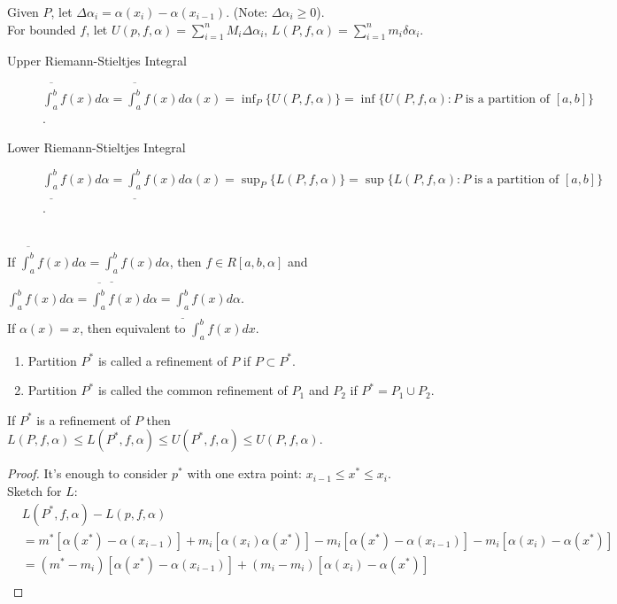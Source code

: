 \begin{define}[2]
	Given $P$, let $\Delta \alpha_i=\alpha(x_{i})-\alpha(x_{i-1})$. (Note: $\Delta \alpha_i\ge 0$).\\
	For bounded $f$, let $U(p,f,\alpha)=\sum_{i=1}^{n}{M_{i} \Delta \alpha_i}$, $L(P,f,\alpha)=\sum_{i=1}^{n}{m_{i}}\delta \alpha_i$.\\
	\begin{description}
		\item[Upper Riemann-Stieltjes Integral] $\overline{\int_{a}^{b}}f(x)d\alpha=\overline{\int_{a}^{b}}f(x)d\alpha(x)=\inf_{P}\{U(P,f,\alpha)\}=\inf\{U(P,f,\alpha):P\text{ is a partition of }[a,b]\}$.
		\item[Lower Riemann-Stieltjes Integral] $\underline{\int_{a}^{b}}f(x)d\alpha=\underline{\int_{a}^{b}}f(x)d\alpha(x)=\sup_{P}\{L(P,f,\alpha)\}=\sup\{L(P,f,\alpha):P\text{ is a partition of }[a,b]\}$.
	\end{description}\hfill\\
	If $\overline{\int_{a}^{b}}f(x)d\alpha=\underline{\int_{a}^{b}}f(x)d\alpha$, then $f\in R[a,b,\alpha]$ and $\int_{a}^{b}f(x)d\alpha=\overline{\int_{a}^{b}}f(x)d\alpha=\underline{\int_{a}^{b}}f(x)d\alpha$.\\
	If $\alpha(x)=x$, then equivalent to $\int_{a}^{b}f(x)dx$.
\end{define}

\begin{define}[3]
	\begin{enumerate}
		\item Partition $P^{*}$ is called a refinement of $P$ if $P\subset P^{*}$.
		\item Partition $P^{*}$ is called the common refinement of $P_1$ and $P_2$ if $P^{*}=P_1 \cup P_2$.
	\end{enumerate}
\end{define}

\begin{thm}[4]
	If $P^{*}$ is a refinement of $P$ then $L(P,f,\alpha)\le L(P^{*},f,\alpha)\le U(P^{*},f,\alpha)\le U(P,f,\alpha)$.
	\begin{proof}
		It's enough to consider $p^{*}$ with one extra point: $x_{i-1}\le x^{*}\le x_{i}$.\\
		Sketch for $L$:\\
		\begin{align*}
			 & L(P^{*},f,\alpha)-L(p,f,\alpha)                                                   \\
			 & = m^{*}[\alpha(x^{*})-\alpha(x_{i-1})]+m_i[\alpha(x_i)\alpha(x^{*})]
			-m_{i}[\alpha(x^{*})-\alpha(x_{i-1})]-m_i[\alpha(x_i)-\alpha(x^{*})]                 \\
			 & = (m^{*}-m_i)[\alpha(x^{*})-\alpha(x_{i-1})]+(m_i-m_i)[\alpha(x_i)-\alpha(x^{*})] \\
		\end{align*}
	\end{proof}
\end{thm}

